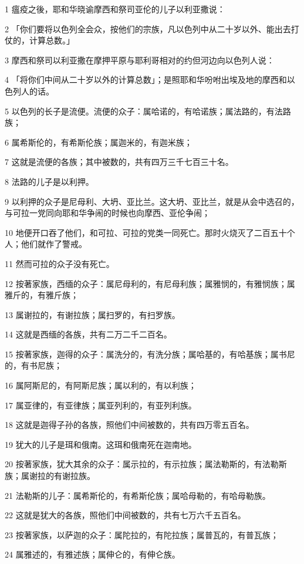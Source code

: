 \par 1 瘟疫之後，耶和华晓谕摩西和祭司亚伦的儿子以利亚撒说：
\par 2 「你们要将以色列全会众，按他们的宗族，凡以色列中从二十岁以外、能出去打仗的，计算总数。」
\par 3 摩西和祭司以利亚撒在摩押平原与耶利哥相对的约但河边向以色列人说：
\par 4 「将你们中间从二十岁以外的计算总数」；是照耶和华吩咐出埃及地的摩西和以色列人的话。
\par 5 以色列的长子是流便。流便的众子：属哈诺的，有哈诺族；属法路的，有法路族；
\par 6 属希斯伦的，有希斯伦族；属迦米的，有迦米族；
\par 7 这就是流便的各族；其中被数的，共有四万三千七百三十名。
\par 8 法路的儿子是以利押。
\par 9 以利押的众子是尼母利、大坍、亚比兰。这大坍、亚比兰，就是从会中选召的，与可拉一党同向耶和华争闹的时候也向摩西、亚伦争闹；
\par 10 地便开口吞了他们，和可拉、可拉的党类一同死亡。那时火烧灭了二百五十个人；他们就作了警戒。
\par 11 然而可拉的众子没有死亡。
\par 12 按著家族，西缅的众子：属尼母利的，有尼母利族；属雅悯的，有雅悯族；属雅斤的，有雅斤族；
\par 13 属谢拉的，有谢拉族；属扫罗的，有扫罗族。
\par 14 这就是西缅的各族，共有二万二千二百名。
\par 15 按著家族，迦得的众子：属洗分的，有洗分族；属哈基的，有哈基族；属书尼的，有书尼族；
\par 16 属阿斯尼的，有阿斯尼族；属以利的，有以利族；
\par 17 属亚律的，有亚律族；属亚列利的，有亚列利族。
\par 18 这就是迦得子孙的各族，照他们中间被数的，共有四万零五百名。
\par 19 犹大的儿子是珥和俄南。这珥和俄南死在迦南地。
\par 20 按著家族，犹大其余的众子：属示拉的，有示拉族；属法勒斯的，有法勒斯族；属谢拉的有谢拉族。
\par 21 法勒斯的儿子：属希斯伦的，有希斯伦族；属哈母勒的，有哈母勒族。
\par 22 这就是犹大的各族，照他们中间被数的，共有七万六千五百名。
\par 23 按著家族，以萨迦的众子：属陀拉的，有陀拉族；属普瓦的，有普瓦族；
\par 24 属雅述的，有雅述族；属伸仑的，有伸仑族。
